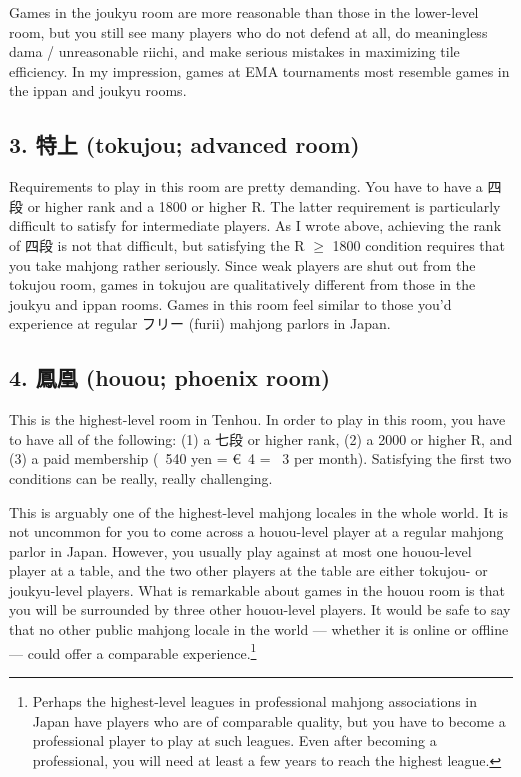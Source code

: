 \bigskip
Games in the {\jap joukyu} room are more reasonable than those in the lower-level room, but you still see many players who do not defend at all, do meaningless {\jap dama} / unreasonable riichi, and make serious mistakes in maximizing tile efficiency. In my impression, games at EMA tournaments most resemble games in the {\jap ippan} and {\jap joukyu} rooms.

\subsection*{3. 特上 ({\jap tokujou}; advanced room)}
Requirements to play in this room are pretty demanding. You have to have a 四段 or higher rank and a 1800 or higher R. The latter requirement is particularly difficult to satisfy for intermediate players. As I wrote above, achieving the rank of 四段 is not that difficult, but satisfying the R $\geq$ 1800 condition requires that you take mahjong rather seriously. Since weak players are shut out from the {\jap tokujou} room, games in {\jap tokujou} are qualitatively different from those in the {\jap joukyu} and {\jap ippan} rooms. Games in this room feel similar to those you'd experience at regular フリー ({\jap furii}) mahjong parlors in Japan.

\subsection*{4. 鳳凰 ({\jap houou}; phoenix room)}
This is the highest-level room in {\jap Tenhou}. In order to play in this room, you have to have all of the following: (1) a 七段 or higher rank, (2) a 2000 or higher R, and (3) a paid membership (\textyen~540 yen = \euro~4 = \textsterling~3 per month). Satisfying the first two conditions can be really, really challenging.

\bigskip
This is arguably one of the highest-level mahjong locales in the whole world. It is not uncommon for you to come across a {\jap houou}-level player at a regular mahjong parlor in Japan. However, you usually play against at most one {\jap houou}-level player at a table, and the two other players at the table are either {\jap tokujou}- or {\jap joukyu}-level players. What is remarkable about games in the {\jap houou} room is that you will be surrounded by three other {\jap houou}-level players.
It would be safe to say that no other public mahjong locale in the world --- whether it is online or offline --- could offer a comparable experience.\footnote{Perhaps the highest-level leagues in professional mahjong associations in Japan have players who are of comparable quality, but you have to become a professional player to play at such leagues. Even after becoming a professional, you will need at least a few years to reach the highest league.}

